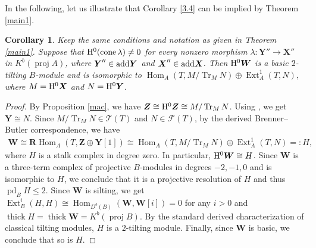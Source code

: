 \documentclass[reqno,12pt]{amsart}
\numberwithin{equation}{section}
\theoremstyle{plain}
\newtheorem{corollary}[theorem]{\bf Corollary}
\theoremstyle{definition}
\begin{document}
In the following, let us illustrate that Corollary \ref{3.4} can be implied by Theorem \ref{main1}.
\begin{corollary}\label{comparison}
Keep the same conditions and notation as given in Theorem \ref{main1}. Suppose
that ${\rm H}^{0}(\operatorname{cone}\lambda)\neq0$ for every nonzero morphism
$\lambda:\boldsymbol{Y}''\to\boldsymbol{X}''$ in
$K^b(\operatorname{proj}A)$, where
$\boldsymbol{Y}''\in{\rm add}\boldsymbol{Y}$ and
$\boldsymbol{X}''\in{\rm add}\boldsymbol{X}$. Then
${\rm H}^0\boldsymbol{W}$ is a basic $2$-tilting $B$-module and is isomorphic
to $\operatorname{Hom}_{A}(T,M/\operatorname{Tr}_{M}N)
\oplus\operatorname{Ext}_{A}^{1}(T,N),$
where $M={\rm H}^{0}\boldsymbol{X}$ and
$N={\rm H}^{0}\boldsymbol{Y}$.
\end{corollary}
\begin{proof}
By Proposition \ref{mac}, we have
$\boldsymbol{Z}\cong{\rm H}^{0}\boldsymbol{Z}
\cong M/\operatorname{Tr}_MN$. Using
\cite[Proposition 5.5]{MAR}, we get $\boldsymbol{Y}\cong N$. Since
$M/\operatorname{Tr}_MN\in\mathcal{T}(T)$ and
$N\in\mathcal{F}(T)$, by the derived Brenner--Butler correspondence, we have
\begin{align*}
\boldsymbol{W}
\cong\mathbf{R}\operatorname{Hom}_A
   (T,\boldsymbol{Z}\oplus\boldsymbol{Y}[1])\cong
\operatorname{Hom}_A(T,M/\operatorname{Tr}_MN)
\oplus\operatorname{Ext}_A^1(T,N)=:H,
\end{align*}
where $H$ is a stalk complex in degree zero. In particular,
${\rm H}^{0}\boldsymbol{W}\cong H$.
Since $\boldsymbol{W}$ is a three-term complex of projective $B$-modules in degrees
$-2,-1,0$ and is isomorphic to $H$, we conclude that it is a projective resolution of $H$
and thus $\operatorname{pd}_B H\leq2$. Since $\boldsymbol{W}$ is silting, we get
$\operatorname{Ext}_B^i(H,H)
\cong\operatorname{Hom}_{D^b(B)}(\boldsymbol{W},\boldsymbol{W}[i])=0$
for any $i>0$ and
$\operatorname{thick}H=\operatorname{thick}\boldsymbol{W}
=K^b(\operatorname{proj}B)$. By the standard derived characterization of
classical tilting modules, $H$ is a $2$-tilting module. Finally, since
$\boldsymbol{W}$ is basic, we conclude that so is $H$.
\end{proof}











\end{document}
